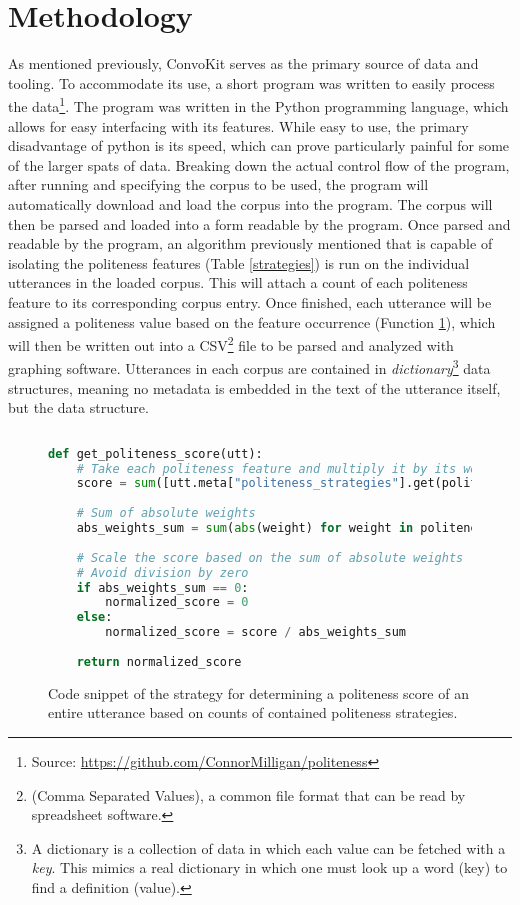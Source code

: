 \documentclass{article}
\begin{document}
\section{Methodology}
As mentioned previously, ConvoKit serves as the primary source of data and tooling. To accommodate its use, a short program was written to easily process the data\footnote{Source: \url{https://github.com/ConnorMilligan/politeness}}. The program was written in the Python programming language, which allows for easy interfacing with its features. While easy to use, the primary disadvantage of python is its speed, which can prove particularly painful for some of the larger spats of data. Breaking down the actual control flow of the program, after running and specifying the corpus to be used, the program will automatically download and load the corpus into the program. The corpus will then be parsed and loaded into a form readable by the program. Once parsed and readable by the program, an algorithm previously mentioned that is capable of isolating the politeness features (Table \ref{strategies}) is run on the individual utterances in the loaded corpus. This will attach a count of each politeness feature to its corresponding corpus entry. Once finished, each utterance will be assigned a politeness value based on the feature occurrence (Function \ref{code:1}), which will then be written out into a CSV\footnote{(Comma Separated Values), a common file format that can be read by spreadsheet software.} file to be parsed and analyzed with graphing software. Utterances in each corpus are contained in \textit{dictionary}\footnote{A dictionary is a collection of data in which each value can be fetched with a \textit{key}. This mimics a real dictionary in which one must look up a word (key) to find a definition (value).} data structures, meaning no metadata is embedded in the text of the utterance itself, but the data structure.

\begin{figure}[]
    \begin{center}
    \caption{Code snippet of the strategy for determining a politeness score of an entire utterance based on counts of contained politeness strategies.}
    \begin{lstlisting}[language=Python]
    
def get_politeness_score(utt):
    # Take each politeness feature and multiply it by its weight, then sum the values
    score = sum([utt.meta["politeness_strategies"].get(politeness_feature, 0) * weight for politeness_feature, weight in politeness_features.items()])
    
    # Sum of absolute weights
    abs_weights_sum = sum(abs(weight) for weight in politeness_features.values())
    
    # Scale the score based on the sum of absolute weights
    # Avoid division by zero
    if abs_weights_sum == 0:
        normalized_score = 0
    else:
        normalized_score = score / abs_weights_sum
    
    return normalized_score
    \end{lstlisting}
    \label{code:1}
    \end{center}
\end{figure}
\end{document}
